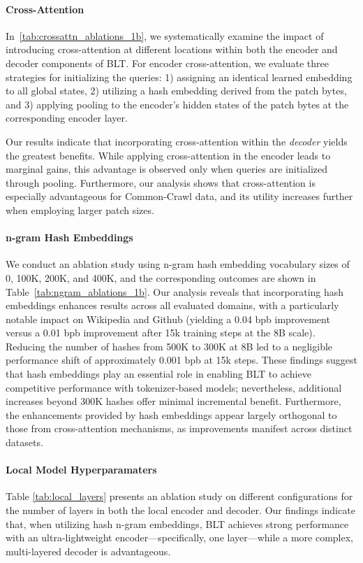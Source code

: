 \paragraph{Cross-Attention} 
In~\autoref{tab:crossattn_ablations_1b}, we systematically examine the impact of introducing cross-attention at different locations within both the encoder and decoder components of {\textsc BLT}. For encoder cross-attention, we evaluate three strategies for initializing the queries: 1) assigning an identical learned embedding to all global states, 2) utilizing a hash embedding derived from the patch bytes, and 3) applying pooling to the encoder’s hidden states of the patch bytes at the corresponding encoder layer.

Our results indicate that incorporating cross-attention within the \textit{decoder} yields the greatest benefits. While applying cross-attention in the encoder leads to marginal gains, this advantage is observed only when queries are initialized through pooling. Furthermore, our analysis shows that cross-attention is especially advantageous for Common-Crawl data, and its utility increases further when employing larger patch sizes.

\paragraph{n-gram Hash Embeddings} 

We conduct an ablation study using n-gram hash embedding vocabulary sizes of 0, 100K, 200K, and 400K, and the corresponding outcomes are shown in Table~\ref{tab:ngram_ablations_1b}. Our analysis reveals that incorporating hash embeddings enhances results across all evaluated domains, with a particularly notable impact on Wikipedia and Github (yielding a 0.04 bpb improvement versus a 0.01 bpb improvement after 15k training steps at the 8B scale). Reducing the number of hashes from 500K to 300K at 8B led to a negligible performance shift of approximately 0.001 bpb at 15k steps. These findings suggest that hash embeddings play an essential role in enabling {\textsc BLT} to achieve competitive performance with tokenizer-based models; nevertheless, additional increases beyond 300K hashes offer minimal incremental benefit. Furthermore, the enhancements provided by hash embeddings appear largely orthogonal to those from cross-attention mechanisms, as improvements manifest across distinct datasets.

\paragraph{Local Model Hyperparamaters} Table \ref{tab:local_layers} presents an ablation study on different configurations for the number of layers in both the local encoder and decoder. Our findings indicate that, when utilizing hash n-gram embeddings, {\textsc BLT} achieves strong performance with an ultra-lightweight encoder—specifically, one layer—while a more complex, multi-layered decoder is advantageous.

